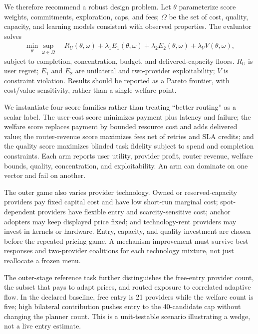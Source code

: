 \documentclass[10pt]{article}
\newcommand{\1}{\mathbf 1}
\begin{document}
We therefore recommend a robust design problem.  Let $\theta$ parameterize score
weights, commitments, exploration, caps, and fees; $\Omega$ be the set of cost,
quality, capacity, and learning models consistent with observed properties.  The
evaluator solves
\begin{align}
\min_\theta\sup_{\omega\in\Omega}\;&
R_U(\theta,\omega)+\lambda_1 E_1(\theta,\omega)
+\lambda_2E_2(\theta,\omega)+\lambda_VV(\theta,\omega),
\end{align}
subject to completion, concentration, budget, and delivered-capacity floors.
$R_U$ is user regret; $E_1$ and $E_2$ are unilateral and two-provider
exploitability; $V$ is constraint violation.  Results should be reported as a
Pareto frontier, with cost/value sensitivity, rather than a single welfare point.

We instantiate four score families rather than treating ``better routing'' as a
scalar label.  The user-cost score minimizes payment plus latency and failure;
the welfare score replaces payment by bounded resource cost and adds delivered
value; the router-revenue score maximizes fees net of retries and SLA credits;
and the quality score maximizes blinded task fidelity subject to spend and
completion constraints.  Each arm reports user utility, provider profit, router
revenue, welfare bounds, quality, concentration, and exploitability.  An arm can
dominate on one vector and fail on another.

The outer game also varies provider technology.  Owned or reserved-capacity
providers pay fixed capital cost and have low short-run marginal cost;
spot-dependent providers have flexible entry and scarcity-sensitive cost;
anchor adopters may keep displayed price fixed; and technology-rent providers
may invest in kernels or hardware.  Entry, capacity, and quality investment are
chosen before the repeated pricing game.  A mechanism improvement must survive
best responses and two-provider coalitions for each technology mixture, not just
reallocate a frozen menu.

The outer-stage reference task further distinguishes the free-entry provider
count, the subset that pays to adapt prices, and routed exposure to correlated
adaptive flow.  In the declared baseline, free entry is 21 providers while the
welfare count is five; high bilateral contribution pushes entry to the
40-candidate cap without changing the planner count.  This is a unit-testable
scenario illustrating a wedge, not a live entry estimate.
\end{document}
